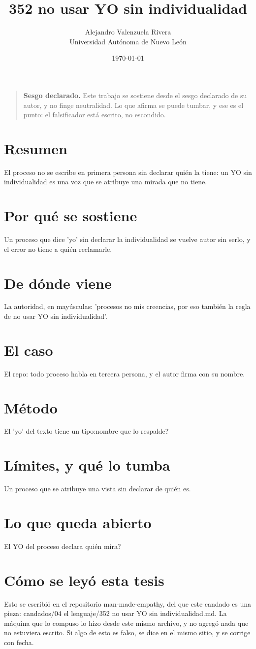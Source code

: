 \documentclass[11pt,a4paper]{article}
\title{352 no usar YO sin individualidad}
\author{Alejandro Valenzuela Rivera\\\small Universidad Autónoma de Nuevo León}
\date{\today}
\begin{document}
\maketitle

\begin{quote}
\textbf{Sesgo declarado.} Este trabajo se sostiene desde el sesgo declarado de su autor, y no finge neutralidad. Lo que afirma se puede tumbar, y ese es el punto: el falsificador está escrito, no escondido.
\end{quote}

\section*{Resumen}
El proceso no se escribe en primera persona sin declarar quién la tiene: un YO sin individualidad es una voz que se atribuye una mirada que no tiene.

\section{Por qué se sostiene}
Un proceso que dice 'yo' sin declarar la individualidad se vuelve autor sin serlo, y el error no tiene a quién reclamarle.

\section{De dónde viene}
La autoridad, en mayúsculas: 'procesos no mis creencias, por eso también la regla de no usar YO sin individualidad'.

\section{El caso}
El repo: todo proceso habla en tercera persona, y el autor firma con su nombre.

\section{Método}
\textquestiondown{}El 'yo' del texto tiene un tipo:nombre que lo respalde?

\section{Límites, y qué lo tumba}
Un proceso que se atribuye una vista sin declarar de quién es.

\section{Lo que queda abierto}
\textquestiondown{}El YO del proceso declara quién mira?

\section*{Cómo se leyó esta tesis}
Esto se escribió en el repositorio man-made-empathy, del que este candado es una pieza: candados/04 el lenguaje/352 no usar YO sin individualidad.md. La máquina que lo compuso lo hizo desde este mismo archivo, y no agregó nada que no estuviera escrito. Si algo de esto es falso, se dice en el mismo sitio, y se corrige con fecha.
\end{document}
